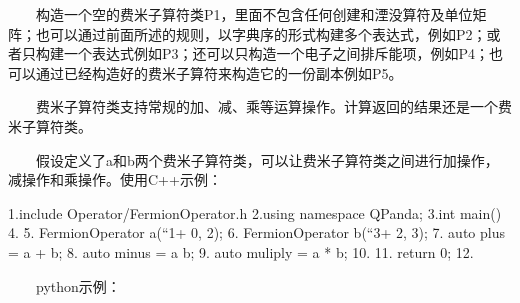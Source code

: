 \documentclass[a4paper,11pt,english]{sphinxmanual}
\begin{document}
\begin{sphinxVerbatim}[commandchars=\\\{\}]
   
 
      
        
       
      
      
\end{sphinxVerbatim}

\sphinxAtStartPar
  构造一个空的费米子算符类P1，里面不包含任何创建和湮没算符及单位矩阵；也可以通过前面所述的规则，以字典序的形式构建多个表达式，例如P2；或者只构建一个表达式例如P3；还可以只构造一个电子之间排斥能项，例如P4；也可以通过已经构造好的费米子算符来构造它的一份副本例如P5。

\sphinxAtStartPar
  费米子算符类支持常规的加、减、乘等运算操作。计算返回的结果还是一个费米子算符类。

\sphinxAtStartPar
  假设定义了a和b两个费米子算符类，可以让费米子算符类之间进行加操作，减操作和乘操作。使用C++示例：

\begin{sphinxVerbatim}[commandchars=\\\{\}]
1.\PYGZsh{}include \PYGZdq{}Operator/FermionOperator.h\PYGZdq{}
2.using namespace QPanda;
3.int main()
4.\PYGZob{}
5.    FermionOperator a(“1+  0\PYGZdq{}, 2);
6.    FermionOperator b(“3+  2\PYGZdq{}, 3);
7.    auto plus = a + b;
8.    auto minus = a \PYGZhy{} b;
9.    auto muliply = a * b;
10.
11.    return 0;
12.\PYGZcb{}
\end{sphinxVerbatim}

\sphinxAtStartPar
  python示例：
\end{document}
